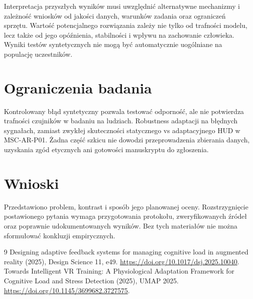 \documentclass[11pt,a4paper]{article}
\begin{document}
Interpretacja przyszłych wyników musi uwzględnić alternatywne mechanizmy i zależność wniosków od jakości danych, warunków zadania oraz ograniczeń sprzętu. Wartość potencjalnego rozwiązania zależy nie tylko od trafności modelu, lecz także od jego opóźnienia, stabilności i wpływu na zachowanie człowieka. Wyniki testów syntetycznych nie mogą być automatycznie uogólniane na populację uczestników.

\section{Ograniczenia badania}

Kontrolowany błąd syntetyczny pozwala testować odporność, ale nie potwierdza trafności czujników w badaniu na ludziach. Robustness adaptacji na błędnych sygnałach, zamiast zwykłej skuteczności statycznego vs adaptacyjnego HUD w MSC-AR-P01. Żadna część szkicu nie dowodzi przeprowadzenia zbierania danych, uzyskania zgód etycznych ani gotowości manuskryptu do zgłoszenia.

\section{Wnioski}

Przedstawiono problem, kontrast i sposób jego planowanej oceny. Rozstrzygnięcie postawionego pytania wymaga przygotowania protokołu, zweryfikowanych źródeł oraz poprawnie udokumentowanych wyników. Bez tych materiałów nie można sformułować konkluzji empirycznych.

\begin{thebibliography}{9}
 Designing adaptive feedback systems for managing cognitive load in augmented reality (2025), Design Science 11, e49. \url{https://doi.org/10.1017/dsj.2025.10040}.
 Towards Intelligent VR Training: A Physiological Adaptation Framework for Cognitive Load and Stress Detection (2025), UMAP 2025. \url{https://doi.org/10.1145/3699682.3727575}.
\end{thebibliography}
\end{document}
